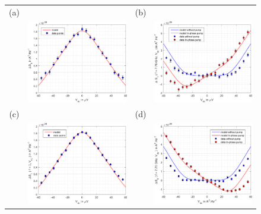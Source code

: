 \begin{figure}[hptb]
	\begin{center}
		\begin{tabular}{c c c c}
			(a) & & (b) & \\
			& \includegraphics[width = 6.5 cm]{./chap3/LF_noise_squeezed_181112} &
			& \includegraphics[width = 6.5 cm]{./chap3/RF_noise_squeezed_181112} \\
			(c) & & (d) & \\
			& \includegraphics[width = 6.5 cm]{./chap3/LF_noise_squeezed_181108_300mV} &
			& \includegraphics[width = 6.5 cm]{./chap3/RF_noise_squeezed_181108_300mV} \\

\end{tabular}
\end{center}
\end{figure}
